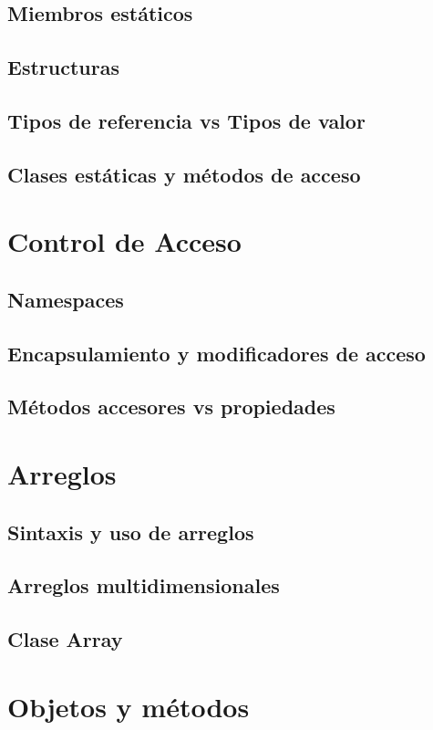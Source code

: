 \documentclass[12pt,a4paper]{report}
\begin{document}
\section{Miembros estáticos}
\section{Estructuras}
\section{Tipos de referencia vs Tipos de valor}
\section{Clases estáticas y métodos de acceso}

\chapter{Control de Acceso}
\section{Namespaces}
\section{Encapsulamiento y modificadores de acceso}
\section{Métodos accesores vs propiedades}

\chapter{Arreglos}
\section{Sintaxis y uso de arreglos}
\section{Arreglos multidimensionales}
\section{Clase Array}

\chapter{Objetos y métodos}
\end{document}

